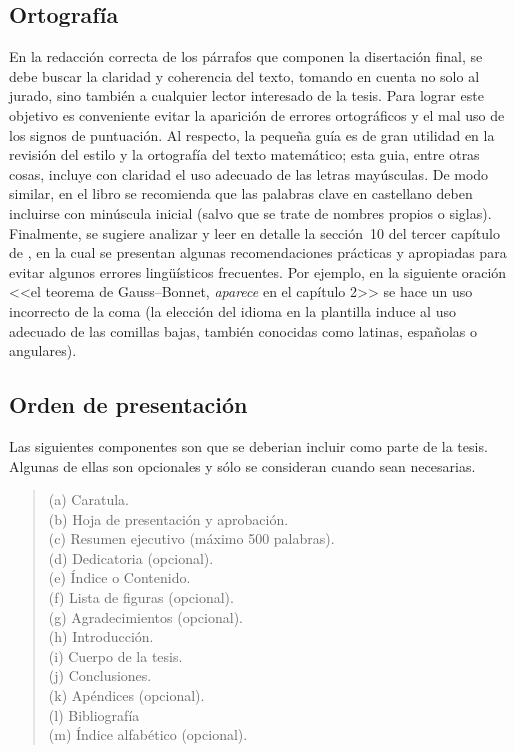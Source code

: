 \subsection{Ortograf\'ia}%
%
En la redacci\'on correcta de los p\'arrafos que componen la disertaci\'on final, se debe buscar la claridad y coherencia del texto, tomando en cuenta no solo al jurado, sino tambi\'en a cualquier  lector interesado de la tesis. 
Para lograr este objetivo es conveniente evitar la aparici\'on de errores ortogr\'aficos y el mal uso de los signos de puntuaci\'on.
Al respecto, la peque\~{n}a gu\'ia \cite{MR3052697} es de gran utilidad en la revisi\'on del estilo y la ortograf\'ia del texto matem\'atico; esta guia, entre otras cosas, incluye con claridad el uso adecuado de las letras may\'usculas.
De modo similar, en el libro \cite{da2016trabajo} se recomienda que las palabras clave en castellano deben incluirse con min\'uscula inicial (salvo que se trate de nombres propios o siglas).
Finalmente, se sugiere analizar y leer en detalle la \mbox{secci\'on 10} del tercer cap\'itulo  de \cite{da2016trabajo}, en la cual se presentan algunas recomendaciones pr\'acticas y apropiadas para evitar algunos errores ling\"{u}\'isticos frecuentes.
Por ejemplo, en la siguiente  oraci\'on  <<el teorema de Gauss--Bonnet, \emph{aparece} en el cap\'itulo 2>> se hace un uso incorrecto de la coma (la elección del idioma en la plantilla induce al uso adecuado de las comillas bajas, también conocidas como latinas, españolas o angulares).
%
\subsection{Orden de presentaci\'on}%
Las siguientes componentes son que se deberian incluir como parte de la tesis.
Algunas de ellas son opcionales y s\'olo se  consideran cuando sean necesarias.
%
\begin{verse}
(a) Caratula. \\
(b) Hoja de presentaci\'on y aprobaci\'on. \\
(c) Resumen ejecutivo (m\'aximo 500 palabras).\\
(d) Dedicatoria (opcional).\\
(e) \'Indice o Contenido.\\
(f) Lista de figuras (opcional).\\
(g) Agradecimientos (opcional).\\
(h) Introducci\'on.\\
(i) Cuerpo de la tesis.\\
(j) Conclusiones.\\
(k) Ap\'endices (opcional).\\
(l) Bibliograf\'ia\\
(m) \'Indice alfab\'etico (opcional).
\end{verse}
%
